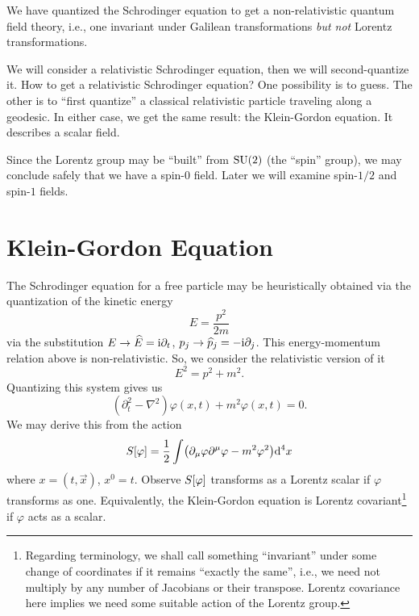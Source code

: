 We have quantized the Schrodinger equation to get a non-relativistic
quantum field theory, i.e., one invariant under Galilean transformations
\emph{but not} Lorentz transformations.

We will consider a relativistic Schrodinger equation, then we will
second-quantize it. How to get a relativistic Schrodinger equation? One
possibility is to guess. The other is to ``first quantize'' a classical
relativistic particle traveling along a geodesic. In either case, we
get the same result: the Klein-Gordon equation. It describes a scalar
field.

Since the Lorentz group may be ``built'' from $\operatorname{SU}(2)$ (the ``spin''
group), we may conclude safely that we have a spin-$0$ field. Later we
will examine spin-$1/2$ and spin-$1$ fields.

\section{Klein-Gordon Equation}
\M
The Schrodinger equation for a free particle may be heuristically
obtained via the quantization of the kinetic energy
\begin{equation}
E = \frac{p^{2}}{2m}
\end{equation}
via the substitution $E\to\widehat{E}=\mathrm{i}\partial_{t}$,
$p_{j}\to\widehat{p}_{j}=-\mathrm{i}\partial_{j}$. This energy-momentum relation
above is non-relativistic. So, we consider the relativistic version of
it
\begin{equation}\label{eq:klein-gordon:mass-shell-relation}
E^{2} = p^{2} + m^{2}.
\end{equation}
Quantizing this system gives us
\begin{equation}\label{eq:klein-gordon:kg-eqn}
(\partial_{t}^{2}-\nabla^{2})\varphi(x,t) + m^{2}\varphi(x,t)=0.
\end{equation}
We may derive this from the action
\begin{equation}
S[\varphi]=\frac{1}{2}\int\bigl(\partial_{\mu}\varphi\partial^{\mu}\varphi-m^{2}\varphi^{2}\bigr)\mathrm{d}^{4}x
\end{equation}
where $x=(t,\vec{x})$, $x^{0}=t$. Observe $S[\varphi]$ transforms
as a Lorentz scalar if $\varphi$ transforms as one. Equivalently, the
Klein-Gordon equation is Lorentz covariant\footnote{Regarding
  terminology, we shall call something ``invariant'' under some change
  of coordinates if it remains ``exactly the same'', i.e., we need not
  multiply by any number of Jacobians or their transpose. Lorentz
  covariance here implies we need some suitable action of the Lorentz group.}
if $\varphi$ acts as a scalar.

